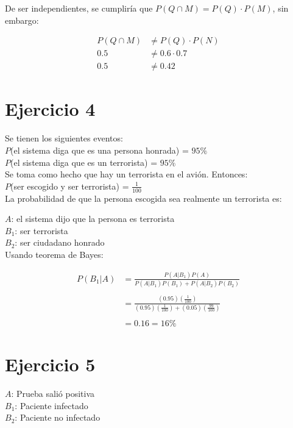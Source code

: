 \documentclass[letterpaper,12pt]{memoir}
\theoremstyle{definition}
\begin{document}
De ser independientes, se cumpliría que \( P(Q \cap M) = P(Q) \cdot P(M)\), sin embargo:

\begin{align*}
  P(Q \cap M) & \not= P(Q) \cdot P(N)\\
      0.5  & \not= 0.6 \cdot 0.7\\
      0.5  & \not= 0.42
\end{align*}


\section*{Ejercicio 4}

Se tienen los siguientes eventos:\\

\(P\)(el sistema diga que es una persona honrada) = \(95\%\)\\
\(P\)(el sistema diga que es un terrorista) = \(95\%\)\\

Se toma como hecho que hay un terrorista en el avión. Entonces: \\
\(P\)(ser escogido y ser terrorista) = \(\frac{1}{100}\)\\

La probabilidad de que la persona escogida sea realmente un terrorista es:

\(A\): el sistema dijo que la persona es terrorista\\
\(B_1\): ser terrorista\\
\(B_2\): ser ciudadano honrado\\

Usando teorema de Bayes:

\begin{align*}
  P(B_1|A) &  = \frac{P(A|B_1)P(A)}{P(A|B_1)P(B_1)+P(A|B_2)P(B_2)}\\
           & \\
           & = \frac{(0.95)(\frac{1}{100})}{(0.95)(\frac{1}{100}) + (0.05)(\frac{99}{100})}\\
           & \\
           & = 0.16 = 16\%
\end{align*}


\section*{Ejercicio 5}

\(A\): Prueba salió positiva\\
\(B_1\): Paciente infectado\\
\(B_2\): Paciente no infectado\\
\end{document}
